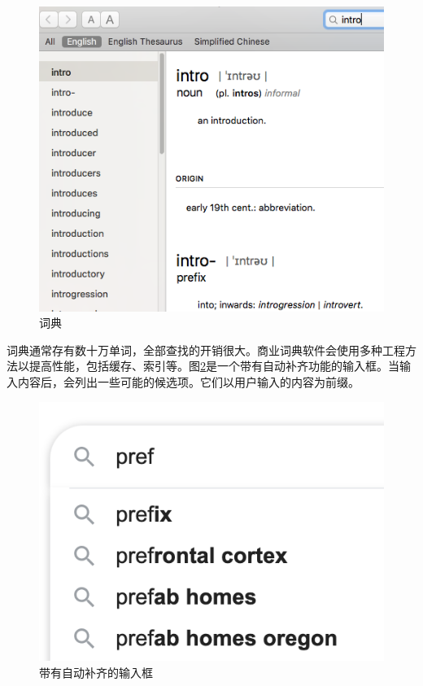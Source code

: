 \documentclass[b5paper]{ctexart}
\begin{document}
\begin{figure}[htbp]
  \centering
  \includegraphics[scale=0.5]{img/edict-en}
  \caption{词典}
  \label{fig:e-dict}
\end{figure}

词典通常存有数十万单词，全部查找的开销很大。商业词典软件会使用多种工程方法以提高性能，包括缓存、索引等。图\ref{fig:word-completion}是一个带有自动补齐功能的输入框。当输入内容后，会列出一些可能的候选项。它们以用户输入的内容为前缀。

\begin{figure}[htbp]
  \centering
  \includegraphics[scale=0.5]{img/adaptive-input}
  \caption{带有自动补齐的输入框}
  \label{fig:word-completion}
\end{figure}
\end{document}
